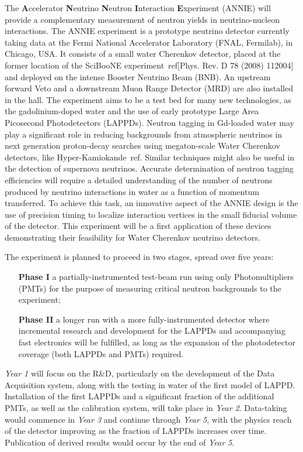 The \textbf{A}ccelerator \textbf{N}eutrino \textbf{N}eutron \textbf{I}nt\-er\-ac\-tion %
\textbf{E}xperiment (ANNIE) will provide a complementary measurement of neutron yields in %
neutrino-nucleon interactions.
The ANNIE experiment is a prototype neutrino detector currently taking data at the %
Fermi National Accelerator Laboratory (FNAL, Fermilab), in Chicago, USA.
It consists of a small water Cherenkov detector, placed at the former location of %
the SciBooNE experiment~ref[Phys. Rev. D 78 (2008) 112004] and %
deployed on the intense Booster Neutrino Beam (BNB).
An upstream forward Veto and a downstream Muon Range Detector (MRD) are also installed %
in the hall.
The experiment aims to be a test bed for many new technologies, as the gadolinium-doped water %
and the use of early prototype Large Area Picosecond Photodetectors (LAPPDs).
Neutron tagging in Gd-loaded water may play a significant role
in reducing backgrounds from atmospheric neutrinos in next generation 
proton-decay searches using megaton-scale Water Cherenkov detectors, like Hyper-Kamiokande~ref.
Similar techniques might also be useful in the detection of supernova neutrinos. 
Accurate determination of neutron tagging efficiencies will require a 
detailed understanding of the number of neutrons produced by neutrino interactions 
in water as a function of momentum transferred.
To achieve this task, an innovative aspect of the ANNIE design is the use of precision %
timing to localize interaction vertices in the small fiducial volume of the detector.
This experiment will be a first application of these devices demonstrating
their feasibility for Water Cherenkov neutrino detectors.

The experiment is planned to proceed in two stages, spread over five years:
\begin{itemize}
  \item[\bfseries Phase I] a partially-instrumented test-beam run using only Photomultipliers %
    (PMTs) for the purpose of measuring critical neutron backgrounds to the experiment;
  \item[\bfseries Phase II] a longer run with a more fully-instrumented detector %
    where incremental research and development for the LAPPDs and %
    accompanying fast electronics will be fulfilled, as long as the expansion of the %
    photodetector coverage (both LAPPDs and PMTs) required.
\end{itemize}

\emph{Year 1} will focus on the R\&D, particularly on the development of the Data Acquisition %
system, along with the testing in water of the first model of LAPPD. 
Installation of the first LAPPDs and a significant fraction of the additional PMTs, as %
well as the calibration system, will take place in \emph{Year 2}.
Data-taking would commence in \emph{Year 3} and continue through \emph{Year 5}, %
with the physics reach of the detector improving as the fraction of LAPPDs increases over time.
Publication of derived results would occur by the end of \emph{Year 5}.

